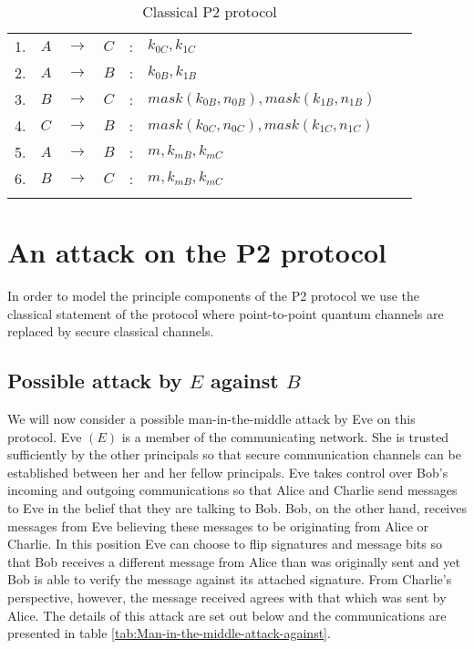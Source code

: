 \documentclass[english]{article}
\providecommand{\tabularnewline}{\\}
\begin{document}
\begin{table}
\begin{tabular}{llllllll}
1. & $A$ & $\longrightarrow$ & $C$ & : & $k_{0C},k_{1C}$ &  & \tabularnewline
2. & $A$ & $\longrightarrow$ & $B$ & : & $k_{0B},k_{1B}$ &  & \tabularnewline
3. & $B$ & $\longrightarrow$ & $C$ & : & $mask\left(k{}_{0B},n_{0B}\right),mask\left(k{}_{1B},n_{1B}\right)$ &  & \tabularnewline
4. & $C$ & $\longrightarrow$ & $B$ & : & $mask\left(k_{0C},n_{0C}\right),mask\left(k_{1C},n_{1C}\right)$ &  & \tabularnewline
5. & $A$ & $\longrightarrow$ & $B$ & : & $m,k_{mB},k_{mC}$ &  & \tabularnewline
6. & $B$ & $\longrightarrow$ & $C$ & : & $m,k_{mB},k_{mC}$ &  & \tabularnewline
 &  &  &  &  &  &  & \tabularnewline
\end{tabular}

\caption{\label{tab:Classical-P2-protocol}Classical P2 protocol}
\end{table}



\section{An attack on the P2 protocol}

In order to model the principle components of the P2 protocol we use
the classical statement of the protocol where point-to-point quantum
channels are replaced by secure classical channels. 


\subsection{Possible attack by $E$ against $B$}

We will now consider a possible man-in-the-middle attack by Eve on
this protocol. Eve $\left(E\right)$ is a member of the communicating
network. She is trusted sufficiently by the other principals so that
secure communication channels can be established between her and her
fellow principals. Eve takes control over Bob's incoming and outgoing
communications so that Alice and Charlie send messages to Eve in the
belief that they are talking to Bob. Bob, on the other hand, receives
messages from Eve believing these messages to be originating from
Alice or Charlie. In this position Eve can choose to flip signatures
and message bits so that Bob receives a different message from Alice
than was originally sent and yet Bob is able to verify the message
against its attached signature. From Charlie's perspective, however,
the message received agrees with that which was sent by Alice. The
details of this attack are set out below and the communications are
presented in table \ref{tab:Man-in-the-middle-attack-against}.
\end{document}
